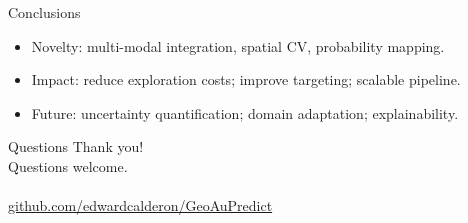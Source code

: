 \documentclass[aspectratio=169]{beamer}
\begin{document}
\begin{frame}{Conclusions}
  \begin{itemize}
    \item Novelty: multi-modal integration, spatial CV, probability mapping.
    \item Impact: reduce exploration costs; improve targeting; scalable pipeline.
    \item Future: uncertainty quantification; domain adaptation; explainability.
  \end{itemize}
\end{frame}

\begin{frame}{Questions}
  \centering\Large Thank you!\\[0.5cm]Questions welcome.\\[0.6cm]
  \href{https://edwardcalderon.github.io/GeoAuPredict/login}{}\\[0.4cm]
  \small \href{https://github.com/edwardcalderon/GeoAuPredict/}{github.com/edwardcalderon/GeoAuPredict}
\end{frame}
\end{document}
